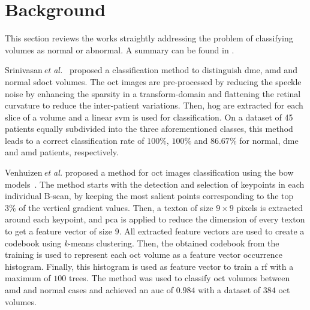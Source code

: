 
\section{Background}\label{sec:rw}
This section reviews the works straightly addressing the problem of classifying \oct volumes as normal or abnormal. A summary can be found in .

Srinivasan\,\textit{et al.}~\cite{Srinivasan2014} proposed a classification method to distinguish \ac{dme}, \ac{amd} and normal \ac{sdoct} volumes.
The \ac{oct} images are pre-processed by reducing the speckle noise by enhancing the sparsity in a transform-domain and flattening the retinal curvature to reduce the inter-patient variations.
Then, \ac{hog} are extracted for each slice of a volume and a linear \ac{svm} is used for classification.
On a dataset of 45 patients equally subdivided into the three aforementioned classes, this method leads to a correct classification rate of $100 \%$, $100 \%$ and $86.67 \%$ for normal, \ac{dme} and \ac{amd} patients, respectively.

Venhuizen\,\textit{et al.} proposed a method for \ac{oct} images classification using the \ac{bow} models~\cite{Venhuizen2015}.
The method starts with the detection and selection of keypoints in each individual B-scan, by keeping the most salient points corresponding to the top $3 \%$ of the vertical gradient values. Then, a texton of size $9 \times 9$ pixels is extracted around each keypoint, and \ac{pca} is applied to reduce the dimension of every texton to get a feature vector of size $9$.
All extracted feature vectors are used to create a codebook using \textit{k}-means clustering.
Then, the obtained codebook from the training is used to represent each \ac{oct} volume as a feature {\color{red}vector occurrence histogram}.
Finally, this histogram is used as feature vector to train a \ac{rf} with a maximum of $100$ trees.
The method was used to classify \ac{oct} volumes between \ac{amd} and normal cases and achieved an \ac{auc} of $0.984$ with a dataset of $384$ \ac{oct} volumes.

